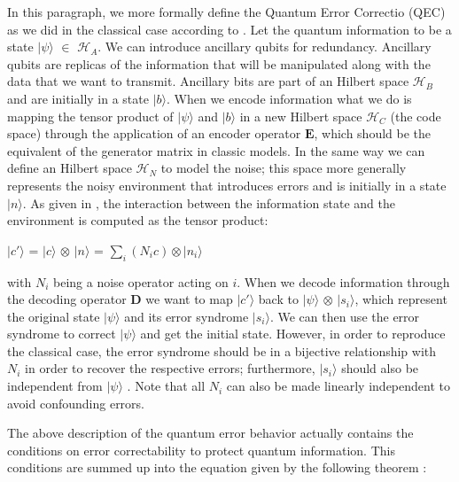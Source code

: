 \documentclass{Configuration_Files/PoliMi3i_thesis}
\begin{document}
In this paragraph, we more formally define the Quantum Error Correctio (QEC) as we did in the classical case according to \cite{Cha06}. 
Let the quantum information to be a state $|\psi \rangle$ $\in$ $\mathscr{H}_A$. We can introduce ancillary qubits for redundancy. Ancillary qubits are replicas of the information that will be manipulated along with the data that we want to transmit.
Ancillary bits are part of an Hilbert space $\mathscr{H}_B$ and are initially in a state $|b \rangle$. When we encode information what we do is mapping the tensor product of $|\psi \rangle$ and $|b \rangle$ in a new Hilbert space $\mathscr{H}_C$ (the code space) through the application of an encoder operator $\textbf{E}$, which should be the equivalent of the generator matrix in classic models. In the same way we can define an Hilbert space  $\mathscr{H}_N$ to model the noise; this space more generally represents the noisy environment that introduces errors and is initially in a state $|n \rangle$. As given in \cite{Cha06}, the interaction between the information state and the environment is computed as the tensor product:

\begin{center}
	$|c' \rangle$ = $|c \rangle$ $\otimes$ $|n \rangle$ = $\sum_{i} (N_i c) \otimes |n_i \rangle $
\end{center}

with $N_i$ being a noise operator acting on $i$.
When we decode information through the decoding operator $\textbf{D}$ we want to map $|c' \rangle$ back to $|\psi \rangle$ $\otimes$ $|s_i \rangle$, which represent the original state $|\psi \rangle$ and its error syndrome $|s_i \rangle$. We can then use the error syndrome to correct $|\psi \rangle$ and get the initial state. However, in order to reproduce the classical case, the error syndrome should be in a bijective relationship with $N_i$ in order to recover the respective errors; furthermore, $|s_i \rangle$ should also be independent from $|\psi \rangle$ . Note that all $N_i$ can also be made linearly independent to avoid confounding errors. 

The above description of the quantum error behavior actually contains the conditions on error correctability to protect quantum information. 
This conditions are summed up into the equation given by the following theorem \cite{Nie06}: 
\end{document}
